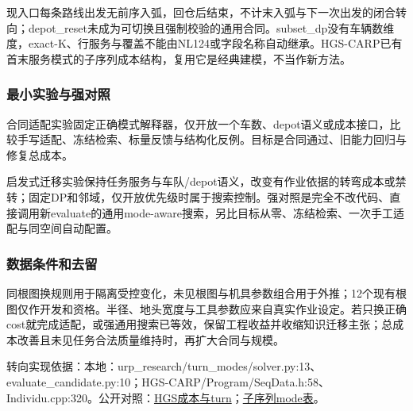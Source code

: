 \documentclass[11pt,a4paper]{article}
\newcommand{\bodytext}[1]{#1\par}
\newcommand{\sourcetext}[1]{{\fontsize{9.2}{14}\selectfont\color{Muted}#1\par}}
\begin{document}
\bodytext{现入口每条路线出发无前序入弧，回仓后结束，不计末入弧与下一次出发的闭合转向；depot\_\allowbreak{}reset未成为可切换且强制校验的通用合同。subset\_\allowbreak{}dp没有车辆数维度，exact-K、行服务与覆盖不能由NL124或字段名称自动继承。HGS-CARP已有首末服务模式的子序列成本结构，复用它是经典建模，不当作新方法。}
\subsubsection{最小实验与强对照}
\bodytext{合同适配实验固定正确模式解释器，仅开放一个车数、depot语义或成本接口，比较手写适配、冻结检索、标量反馈与结构化反例。目标是合同通过、旧能力回归与修复总成本。}
\bodytext{启发式迁移实验保持任务服务与车队/\allowbreak{}depot语义，改变有作业依据的转弯成本或禁转；固定DP和邻域，仅开放优先级时属于搜索控制。强对照是完全不改代码、直接调用新evaluate的通用mode-aware搜索，另比目标从零、冻结检索、一次手工适配与同空间自动配置。}
\subsubsection{数据条件和去留}
\bodytext{同根图换规则用于隔离受控变化，未见根图与机具参数组合用于外推；12个现有根图仅作开发和资格。半径、地头宽度与工具参数应来自真实作业设定。若只换正确cost就完成适配，或强通用搜索已等效，保留工程收益并收缩知识迁移主张；总成本改善且未见任务合法质量维持时，再扩大合同与规模。}
\sourcetext{转向实现依据：本地：urp\_\allowbreak{}research/\allowbreak{}turn\_\allowbreak{}modes/\allowbreak{}solver.py:13、evaluate\_\allowbreak{}candidate.py:10；HGS-CARP/\allowbreak{}Program/\allowbreak{}SeqData.h:58、Individu.cpp:320。公开对照：\href{https://github.com/vidalt/HGS-CARP/blob/08fde6a5672c3814dca1b4450aa9e5968b1d273a/Program/Params.cpp\#L1041-L1097}{HGS成本与turn}；\href{https://github.com/vidalt/HGS-CARP/blob/08fde6a5672c3814dca1b4450aa9e5968b1d273a/Program/SeqData.cpp\#L514-L538}{子序列mode表}。}
\clearpage
\hypertarget{part_3}{}
\end{document}
